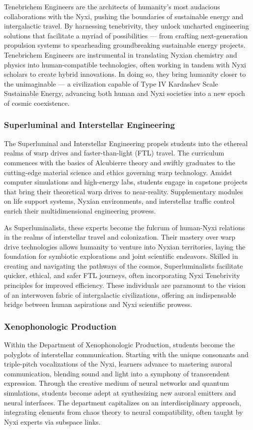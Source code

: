 Tenebrichem Engineers are the architects of humanity's most audacious
collaborations with the Nyxi, pushing the boundaries of sustainable energy and
intergalactic travel. By harnessing tenebrivity, they unlock uncharted
engineering solutions that facilitate a myriad of possibilities — from crafting
next-generation propulsion systems to spearheading groundbreaking sustainable
energy projects. Tenebrichem Engineers are instrumental in translating Nyxian
chemistry and physics into human-compatible technologies, often working in
tandem with Nyxi scholars to create hybrid innovations. In doing so, they bring
humanity closer to the unimaginable — a civilization capable of Type IV
Kardashev Scale Sustainable Energy, advancing both human and Nyxi societies
into a new epoch of cosmic coexistence.

\subsubsection{Superluminal and Interstellar Engineering}
The Superluminal and Interstellar Engineering propels students into the
ethereal realms of warp drives and faster-than-light (FTL) travel. The
curriculum commences with the basics of Alcubierre theory and swiftly graduates
to the cutting-edge material science and ethics governing warp technology.
Amidst computer simulations and high-energy labs, students engage in capstone
projects that bring their theoretical warp drives to near-reality.
Supplementary modules on life support systems, Nyxian environments, and
interstellar traffic control enrich their multidimensional engineering prowess.

As Superluminalists, these experts become the fulcrum of human-Nyxi relations
in the realms of interstellar travel and colonization. Their mastery over warp
drive technologies allows humanity to venture into Nyxian territories, laying
the foundation for symbiotic explorations and joint scientific endeavors.
Skilled in creating and navigating the pathways of the cosmos, Superluminalists
facilitate quicker, ethical, and safer FTL journeys, often incorporating Nyxi
Tenebrivity principles for improved efficiency. These individuals are paramount
to the vision of an interwoven fabric of intergalactic civilizations, offering
an indispensable bridge between human aspirations and Nyxi scientific prowess.

\subsubsection{Xenophonologic Production}
Within the Department of Xenophonologic Production, students become the
polyglots of interstellar communication. Starting with the unique consonants
and triple-pitch vocalizations of the Nyxi, learners advance to mastering
auroral communication, blending sound and light into a symphony of transcendent
expression. Through the creative medium of neural networks and quantum
simulations, students become adept at synthesizing new auroral emitters and
neural interfaces. The department capitalizes on an interdisciplinary approach,
integrating elements from chaos theory to neural compatibility, often taught by
Nyxi experts via subspace links.

